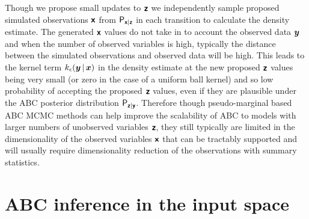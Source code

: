Though we propose small updates to $\boldsymbol{\mathsf{z}}$ we independently sample proposed simulated observations $\boldsymbol{\mathsf{x}}$ from $\mathsf{P}_{\boldsymbol{\mathsf{x}}|\boldsymbol{\mathsf{z}}}$ in each transition to calculate the density estimate. The generated $\boldsymbol{\mathsf{x}}$ values do not take in to account the observed data $\boldsymbol{y}$ and when the number of observed variables is high, typically the distance between the simulated observations and observed data will be high. This leads to the kernel term $k_\epsilon(\boldsymbol{y}\operatorname{|}\boldsymbol{x})$ in the density estimate at the new proposed $\boldsymbol{\mathsf{z}}$ values being very small (or zero in the case of a uniform ball kernel) and so low probability of accepting the proposed $\boldsymbol{\mathsf{z}}$ values, even if they are plausible under the \ac{ABC} posterior distribution $\mathsf{P}_{\boldsymbol{\mathsf{z}}|\boldsymbol{\mathsf{y}}}$. Therefore though pseudo-marginal based \ac{ABC} \ac{MCMC} methods can help improve the scalability of \ac{ABC} to models with larger numbers of unobserved variables $\boldsymbol{\mathsf{z}}$, they still typically are limited in the dimensionality of the observed variables $\boldsymbol{\mathsf{x}}$ that can be tractably supported and will usually require dimensionality reduction of the observations with summary statistics. 

\section{ABC inference in the input space}\label{sec:cond-inf}

